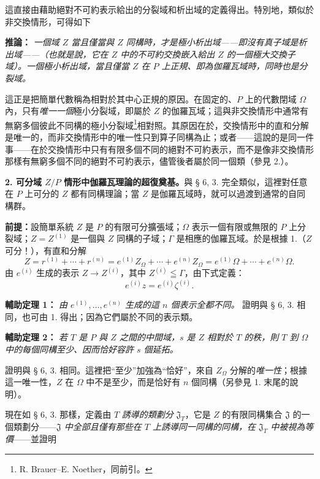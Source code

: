 \documentclass[11pt]{article}
\providecommand{\srcspaced}[1]{#1}
\begin{document}
這直接由藉助絕對不可約表示給出的分裂域和析出域的定義得出。特別地，類似於非交換情形，可得如下

\noindent\textbf{\srcspaced{推論：}} \emph{一個域 \(Z\) 當且僅當與 \(Z\) 同構時，才是極小析出域——即沒有真子域是析出域——（也就是說，它在 \(Z\) 中的不可約交換嵌入給出 \(Z\) 的一個極大交換子域）。一個極小析出域，當且僅當 \(Z\) 在 \(P\) 上正規、即為伽羅瓦域時，同時也是分裂域。}

這正是把簡單代數稱為相對於其中心正規的原因。在固定的、\(P\) 上的代數閉域 \(\Omega\) 內，只有\emph{唯一一個}極小分裂域，即屬於 \(Z\) 的伽羅瓦域；這與非交換情形中通常有無窮多個彼此不同構的極小分裂域\footnote{R. Brauer--E. Noether，同前引。}相對照。其原因在於，交換情形中的直和分解是唯一的，而非交換情形中的唯一性只到算子同構為止；或者——這說的是同一件事——在於交換情形中只有有限多個不同的絕對不可約表示，而不是像非交換情形那樣有無窮多個不同的絕對不可約表示，儘管後者屬於同一個類（參見 2.）。

\medskip
\noindent\textbf{\srcspaced{2. 可分域 \(Z/P\) 情形中伽羅瓦理論的超復奠基。}}\quad 與 § 6, 3. 完全類似，這裡對任意在 \(P\) 上可分的 \(Z\) 都有同構理論；當 \(Z\) 是伽羅瓦域時，就可以過渡到通常的自同構群。

\medskip
\noindent\textbf{\srcspaced{前提：}}\quad 設簡單系統 \(Z\) 是 \(P\) 的有限可分擴張域；\(\Omega\) 表示一個有限或無限的 \(P\) 上分裂域；\(Z=Z^{(1)}\) 是一個與 \(Z\) 同構的子域；\(\Gamma\) 是相應的伽羅瓦域。於是根據 1.（\(Z\) 可分！），有直和分解
\[
        Z=r^{(1)}+\cdots+r^{(n)}
        =e^{(1)}Z_\Omega+\cdots+e^{(n)}Z_\Omega
        =e^{(1)}\Omega+\cdots+e^{(n)}\Omega .
\]
由 \(e^{(i)}\) 生成的表示 \(Z\to Z^{(i)}\)，其中 \(Z^{(i)}\leqq\Gamma\)，由下式定義：
\[
        e^{(i)}z=e^{(i)}\zeta^{(i)}.
\]

\noindent\textbf{\srcspaced{輔助定理 1：}} \emph{由 \(e^{(1)},\ldots,e^{(n)}\) 生成的這 \(n\) 個表示全都不同。} 證明與 § 6, 3. 相同，也可由 1. 得出；因為它們屬於不同的表示類。

\noindent\textbf{\srcspaced{輔助定理 2：}} \emph{若 \(T\) 是 \(P\) 與 \(Z\) 之間的中間域，\(s\) 是 \(Z\) 相對於 \(T\) 的秩，則 \(T\) 到 \(\Omega\) 中的每個同構至少、因而恰好容許 \(s\) 個延拓。}

證明與 § 6, 3. 相同。這裡把“至少”加強為“恰好”，來自 \(Z_\Omega\) 分解的\emph{唯一性}；根據這一唯一性，\(Z\) 在 \(\Omega\) 中不是至少，而是恰好有 \(n\) 個同構（另參見 1. 末尾的說明）。

現在如 § 6, 3. 那樣，定義由 \(T\) \emph{誘導的類劃分} \(\mathfrak J_T\)，它是 \(Z\) 的有限同構集合 \(\mathfrak J\) 的一個類劃分——\emph{\(\mathfrak J\) 中全部且僅有那些在 \(T\) 上誘導同一同構的同構，在 \(\mathfrak J_T\) 中被視為等價}——並證明
\end{document}

